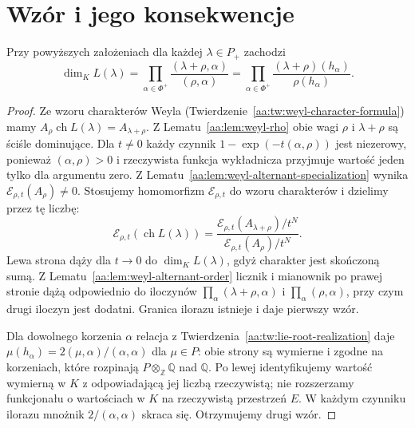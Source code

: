 \section{Wzór i jego konsekwencje}

\begin{twierdzenie}
\label{aa:tw:weyl-dimension}
Przy powyższych założeniach dla każdej $\lambda\in P_+$ zachodzi
\[
 \dim_K L(\lambda)=
 \prod_{\alpha\in\Phi^+}
 \frac{(\lambda+\rho,\alpha)}{(\rho,\alpha)}
 =\prod_{\alpha\in\Phi^+}
 \frac{(\lambda+\rho)(h_\alpha)}{\rho(h_\alpha)}.
\]
\end{twierdzenie}
\begin{proof}
Ze wzoru charakterów Weyla (Twierdzenie~\ref{aa:tw:weyl-character-formula}) mamy
$A_\rho\operatorname{ch}L(\lambda)=A_{\lambda+\rho}$.
Z Lematu~\ref{aa:lem:weyl-rho} obie wagi $\rho$ i $\lambda+\rho$ są ściśle dominujące. Dla $t\ne0$ każdy czynnik $1-\exp(-t(\alpha,\rho))$ jest niezerowy, ponieważ $(\alpha,\rho)>0$ i rzeczywista funkcja wykładnicza przyjmuje wartość jeden tylko dla argumentu zero. Z Lematu~\ref{aa:lem:weyl-alternant-specialization} wynika $\mathcal E_{\rho,t}(A_\rho)\ne0$. Stosujemy homomorfizm $\mathcal E_{\rho,t}$ do wzoru charakterów i dzielimy przez tę liczbę:
\[
 \mathcal E_{\rho,t}(\operatorname{ch}L(\lambda))
 =\frac{\mathcal E_{\rho,t}(A_{\lambda+\rho})/t^N}
        {\mathcal E_{\rho,t}(A_\rho)/t^N}.
\]
Lewa strona dąży dla $t\to0$ do $\dim_K L(\lambda)$, gdyż charakter jest skończoną sumą. Z Lematu~\ref{aa:lem:weyl-alternant-order} licznik i mianownik po prawej stronie dążą odpowiednio do iloczynów $\prod_\alpha(\lambda+\rho,\alpha)$ i $\prod_\alpha(\rho,\alpha)$, przy czym drugi iloczyn jest dodatni. Granica ilorazu istnieje i daje pierwszy wzór.

Dla dowolnego korzenia $\alpha$ relacja z Twierdzenia~\ref{aa:tw:lie-root-realization} daje
$\mu(h_\alpha)=2(\mu,\alpha)/(\alpha,\alpha)$ dla $\mu\in P$: obie strony są wymierne i zgodne na korzeniach, które rozpinają $P\otimes_{\mathbb Z}\mathbb Q$ nad $\mathbb Q$. Po lewej identyfikujemy wartość wymierną w $K$ z odpowiadającą jej liczbą rzeczywistą; nie rozszerzamy funkcjonału o wartościach w $K$ na rzeczywistą przestrzeń $E$. W każdym czynniku ilorazu mnożnik $2/(\alpha,\alpha)$ skraca się. Otrzymujemy drugi wzór.
\end{proof}

